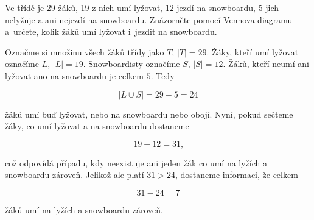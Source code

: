 \begin{questions}
    \question[2]
        Ve třídě je 29 žáků, 19 z nich umí lyžovat, 12 jezdí na snowboardu, 5 jich nelyžuje a ani nejezdí na snowboardu. 
        Znázorněte pomocí Vennova diagramu a~určete, kolik žáků umí lyžovat i~jezdit na snowboardu.

        \begin{solution}[20cm]
            Označme si množinu všech žáků třídy jako $T$, $|T| = 29$. Žáky, kteří umí lyžovat označíme $L$, $|L| = 19$. 
            Snowboardisty označíme $S$, $|S| = 12$. Žáků, kteří neumí ani lyžovat ano na snowboardu je celkem $5$. Tedy 
                
                $$ |L \displaystyle \cup S| = 29 - 5 = 24 $$

            žáků umí buď lyžovat, nebo na snowboardu nebo obojí. Nyní, pokud sečteme žáky, co umí lyžovat a na snowboardu
            dostaneme 
                
                $$ 19 + 12 = 31\text{,} $$
            
            což odpovídá případu, kdy neexistuje ani jeden žák co umí na lyžích a snowboardu zároveň. Jelikož ale platí $31 > 24$,
            dostaneme informaci, že celkem 
                
                $$ 31 - 24 = 7 $$
            
            žáků umí na lyžích a snowboardu zároveň.


        \end{solution}        

\end{questions}

